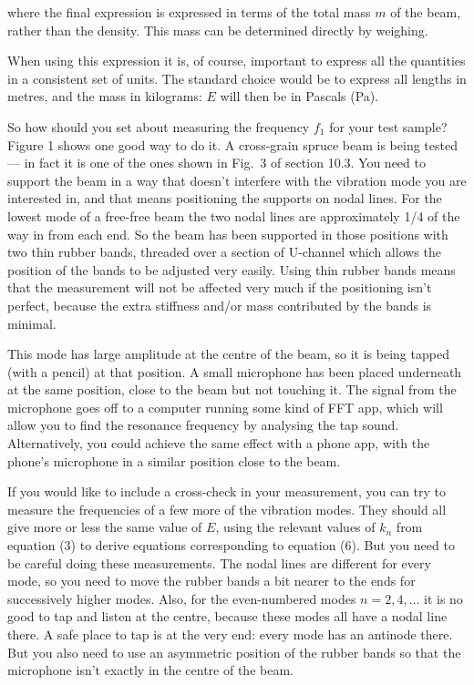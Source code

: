   \noindent{}where the final expression is expressed in terms of the total mass 
  $m$ of the beam, rather than the density. This mass can be determined 
  directly by weighing. 

  When using this expression it is, of course, important to express all the 
  quantities in a consistent set of units. The standard choice would be to 
  express all lengths in metres, and the mass in kilograms: $E$ will then be in 
  Pascals (Pa). 

  So how should you set about measuring the frequency $f_1$ for your test 
  sample? Figure 1 shows one good way to do it. A cross-grain spruce beam is 
  being tested — in fact it is one of the ones shown in Fig.\ 3 of section 
  10.3. You need to support the beam in a way that doesn’t interfere with the 
  vibration mode you are interested in, and that means positioning the supports 
  on nodal lines. For the lowest mode of a free-free beam the two nodal lines 
  are approximately 1/4 of the way in from each end. So the beam has been 
  supported in those positions with two thin rubber bands, threaded over a 
  section of U-channel which allows the position of the bands to be adjusted 
  very easily. Using thin rubber bands means that the measurement will not be 
  affected very much if the positioning isn’t perfect, because the extra 
  stiffness and/or mass contributed by the bands is minimal. 


  This mode has large amplitude at the centre of the beam, so it is being 
  tapped (with a pencil) at that position. A small microphone has been placed 
  underneath at the same position, close to the beam but not touching it. The 
  signal from the microphone goes off to a computer running some kind of FFT 
  app, which will allow you to find the resonance frequency by analysing the 
  tap sound. Alternatively, you could achieve the same effect with a phone app, 
  with the phone’s microphone in a similar position close to the beam. 

  If you would like to include a cross-check in your measurement, you can try 
  to measure the frequencies of a few more of the vibration modes. They should 
  all give more or less the same value of $E$, using the relevant values of 
  $k_n$ from equation (3) to derive equations corresponding to equation (6). 
  But you need to be careful doing these measurements. The nodal lines are 
  different for every mode, so you need to move the rubber bands a bit nearer 
  to the ends for successively higher modes. Also, for the even-numbered modes 
  $n=2,4,…$ it is no good to tap and listen at the centre, because these modes 
  all have a nodal line there. A safe place to tap is at the very end: every 
  mode has an antinode there. But you also need to use an asymmetric position 
  of the rubber bands so that the microphone isn’t exactly in the centre of the 
  beam. 


